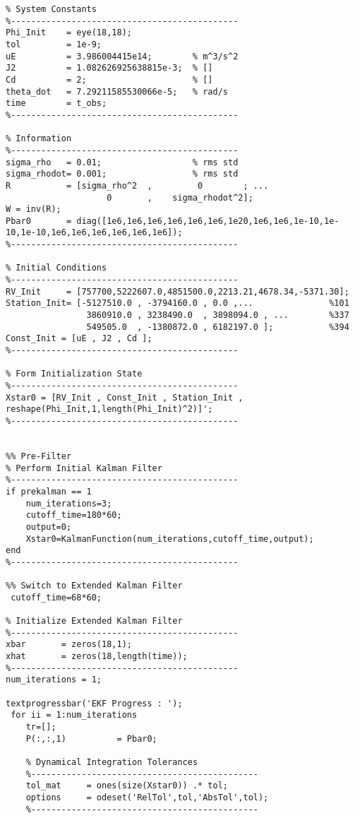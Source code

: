 \documentclass[12pt,a4paper,oneside]{article}
\numberwithin{equation}{section}   		%
\begin{document}
\begin{appendices}
\begin{lstlisting}
% System Constants
%---------------------------------------------
Phi_Init    = eye(18,18);
tol         = 1e-9;
uE          = 3.986004415e14;        % m^3/s^2
J2          = 1.082626925638815e-3;  % []
Cd          = 2;                     % []
theta_dot   = 7.29211585530066e-5;   % rad/s
time        = t_obs;
%---------------------------------------------

% Information
%---------------------------------------------
sigma_rho   = 0.01;                  % rms std
sigma_rhodot= 0.001;                 % rms std
R           = [sigma_rho^2  ,         0        ; ...
                    0       ,    sigma_rhodot^2];
W = inv(R);                
Pbar0       = diag([1e6,1e6,1e6,1e6,1e6,1e6,1e20,1e6,1e6,1e-10,1e-10,1e-10,1e6,1e6,1e6,1e6,1e6,1e6]);
%---------------------------------------------

% Initial Conditions
%---------------------------------------------
RV_Init     = [757700,5222607.0,4851500.0,2213.21,4678.34,-5371.30];
Station_Init= [-5127510.0 , -3794160.0 , 0.0 ,...               %101
                3860910.0 , 3238490.0  , 3898094.0 , ...        %337
                549505.0  , -1380872.0 , 6182197.0 ];           %394
Const_Init = [uE , J2 , Cd ];
%---------------------------------------------

% Form Initialization State
%---------------------------------------------
Xstar0 = [RV_Init , Const_Init , Station_Init , reshape(Phi_Init,1,length(Phi_Init)^2)]';
%---------------------------------------------


%% Pre-Filter 
% Perform Initial Kalman Filter
%---------------------------------------------
if prekalman == 1
    num_iterations=3;
    cutoff_time=180*60;
    output=0;
    Xstar0=KalmanFunction(num_iterations,cutoff_time,output);
end
%---------------------------------------------

%% Switch to Extended Kalman Filter 
 cutoff_time=68*60;
 
% Initialize Extended Kalman Filter
%---------------------------------------------
xbar       = zeros(18,1);
xhat       = zeros(18,length(time));
%---------------------------------------------
num_iterations = 1;

textprogressbar('EKF Progress : ');
 for ii = 1:num_iterations
    tr=[];
    P(:,:,1)          = Pbar0;
    
    % Dynamical Integration Tolerances
    %---------------------------------------------
    tol_mat     = ones(size(Xstar0)) .* tol;
    options     = odeset('RelTol',tol,'AbsTol',tol);
    %---------------------------------------------
    

\end{lstlisting}
\end{appendices}
\end{document}
